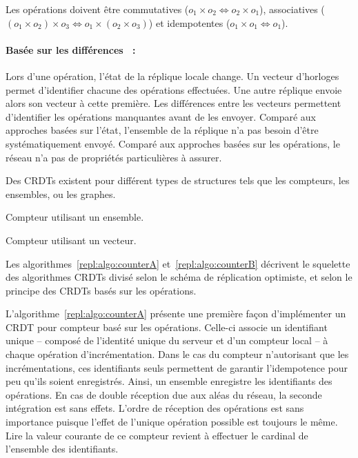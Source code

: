 \noindent Les opérations doivent être commutatives
($o_1 \times o_2 \Leftrightarrow o_2 \times o_1$), associatives
($(o_1 \times o_2) \times o_3 \Leftrightarrow o_1 \times (o_2 \times o_3)$) et
idempotentes ($o_1 \times o_1 \Leftrightarrow o_1$).

\paragraph{Basée sur les différences~\cite{vanderlinde2016delta} :} Lors d'une
opération, l'état de la réplique locale change. Un vecteur d'horloges permet
d'identifier chacune des opérations effectuées. Une autre réplique envoie alors
son vecteur à cette première. Les différences entre les vecteurs permettent
d'identifier les opérations manquantes avant de les envoyer. Comparé aux
approches basées sur l'état, l'ensemble de la réplique n'a pas besoin d'être
systématiquement envoyé. Comparé aux approches basées sur les opérations, le
réseau n'a pas de propriétés particulières à assurer.


Des CRDTs existent pour différent types de structures tels que les compteurs,
les ensembles, ou les graphes.\\
{\noindent%
\begin{minipage}[t]{0.48\textwidth}
  \begin{algorithm}[H]
    
    \caption[Compteur utilisant un ensemble]
    {\label{repl:algo:counterA} Compteur utilisant un ensemble.}
  \end{algorithm}
\end{minipage}%
\hfill%
\begin{minipage}[t]{0.48\textwidth}
  \begin{algorithm}[H]
    
    \caption[Compteur utilisant un vecteur]
    {\label{repl:algo:counterB} Compteur utilisant un vecteur.}
  \end{algorithm}
\end{minipage}
}

Les algorithmes~\ref{repl:algo:counterA} et~\ref{repl:algo:counterB} décrivent
le squelette des algorithmes CRDTs divisé selon le schéma de réplication
optimiste, et selon le principe des CRDTs basés sur les opérations.

L'algorithme~\ref{repl:algo:counterA} présente une première façon d'implémenter
un CRDT pour compteur basé sur les opérations. Celle-ci associe un identifiant
unique -- composé de l'identité unique du serveur et d'un compteur local -- à
chaque opération d'incrémentation. Dans le cas du compteur n'autorisant que les
incrémentations, ces identifiants seuls permettent de garantir l'idempotence
pour peu qu'ils soient enregistrés. Ainsi, un ensemble enregistre les
identifiants des opérations. En cas de double réception due aux aléas du réseau,
la seconde intégration est sans effets. L'ordre de réception des opérations est
sans importance puisque l'effet de l'unique opération possible est toujours le
même. Lire la valeur courante de ce compteur revient à effectuer le cardinal de
l'ensemble des identifiants.


